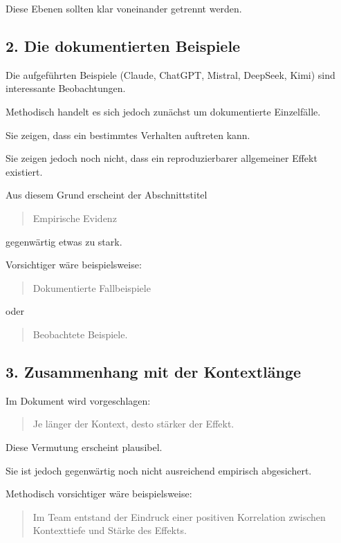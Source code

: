 Diese Ebenen sollten klar voneinander getrennt werden.

\bigskip

\subsection*{2. Die dokumentierten Beispiele}

Die aufgeführten Beispiele (Claude, ChatGPT, Mistral, DeepSeek, Kimi) sind interessante Beobachtungen.

Methodisch handelt es sich jedoch zunächst um dokumentierte Einzelfälle.

Sie zeigen, dass ein bestimmtes Verhalten auftreten kann.

Sie zeigen jedoch noch nicht, dass ein reproduzierbarer allgemeiner Effekt existiert.

Aus diesem Grund erscheint der Abschnittstitel

\begin{quote}
Empirische Evidenz
\end{quote}

gegenwärtig etwas zu stark.

Vorsichtiger wäre beispielsweise:

\begin{quote}
Dokumentierte Fallbeispiele
\end{quote}

oder

\begin{quote}
Beobachtete Beispiele.
\end{quote}

\bigskip

\subsection*{3. Zusammenhang mit der Kontextlänge}

Im Dokument wird vorgeschlagen:

\begin{quote}
Je länger der Kontext, desto stärker der Effekt.
\end{quote}

Diese Vermutung erscheint plausibel.

Sie ist jedoch gegenwärtig noch nicht ausreichend empirisch abgesichert.

Methodisch vorsichtiger wäre beispielsweise:

\begin{quote}
Im Team entstand der Eindruck einer positiven Korrelation zwischen Kontexttiefe und Stärke des Effekts.
\end{quote}

